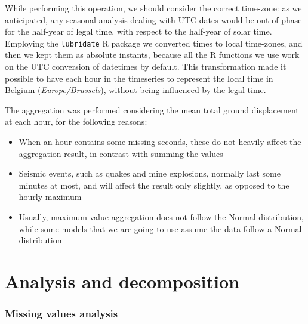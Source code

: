 \documentclass[12pt]{article}
\begin{document}
While performing this operation, we should consider the correct time-zone: as we anticipated, any seasonal analysis dealing with UTC dates would be out of phase for the half-year of legal time, with respect to the half-year of solar time. Employing the \texttt{lubridate} R package we converted times to local time-zones, and then we kept them as absolute instants, because all the R functions we use work on the UTC conversion of datetimes by default. This transformation made it possible to have each hour in the timeseries to represent the local time in Belgium (\textit{Europe/Brussels}), without being influenced by the legal time.

The aggregation was performed considering the mean total ground displacement at each hour, for the following reasons:
\begin{itemize}[topsep=0.5em,itemsep=0em,partopsep=0.5em]
	\item When an hour contains some missing seconds, these do not heavily affect the aggregation result, in contrast with summing the values
	\item Seismic events, such as quakes and mine explosions, normally last some minutes at most, and will affect the result only slightly, as opposed to the hourly maximum
	\item Usually, maximum value aggregation does not follow the Normal distribution, while some models that we are going to use assume the data follow a Normal distribution
\end{itemize}

\section{Analysis and decomposition}
\subsubsection{Missing values analysis}


\end{document}
